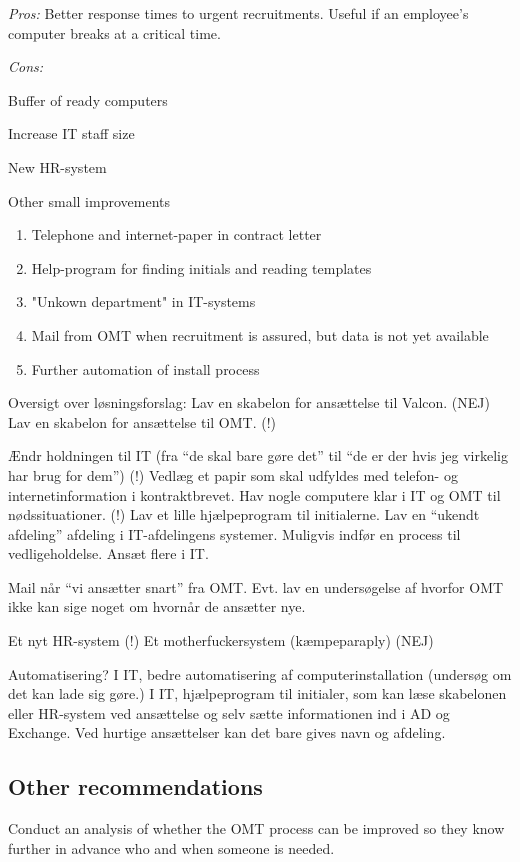 \noindent \emph{Pros:} Better response times to urgent recruitments. Useful if an employee's computer breaks at a critical time.

\noindent \emph{Cons:} 



\item Buffer of ready computers
\item Increase IT staff size
\item New HR-system
\item Other small improvements
\begin{enumerate}
	\item Telephone and internet-paper in contract letter
	\item Help-program for finding initials and reading templates
	\item "Unkown department" in IT-systems
	\item Mail from OMT when recruitment is assured, but data is not yet available
	\item Further automation of install process
\end{enumerate}


Oversigt over løsningsforslag:
Lav en skabelon for ansættelse til Valcon. (NEJ)
Lav en skabelon for ansættelse til OMT. (!)

Ændr holdningen til IT (fra “de skal bare gøre det” til “de er der hvis jeg virkelig har brug for dem”) (!)
Vedlæg et papir som skal udfyldes med telefon- og internetinformation i kontraktbrevet.
Hav nogle computere klar i IT og OMT til nødssituationer. (!)
Lav et lille hjælpeprogram til initialerne. 
Lav en “ukendt afdeling” afdeling i IT-afdelingens systemer. Muligvis indfør en process til vedligeholdelse.
Ansæt flere i IT.

Mail når “vi ansætter snart” fra OMT.
Evt. lav en undersøgelse af hvorfor OMT ikke kan sige noget om hvornår de ansætter nye.

Et nyt HR-system (!)
Et motherfuckersystem (kæmpeparaply) (NEJ)

Automatisering?
I IT, bedre automatisering af computerinstallation (undersøg om det kan lade sig gøre.)
I IT, hjælpeprogram til initialer, som kan læse skabelonen eller HR-system ved ansættelse og selv sætte informationen ind i AD og Exchange. Ved hurtige ansættelser kan det bare gives navn og afdeling.

\subsection{Other recommendations}
Conduct an analysis of whether the OMT process can be improved so they know further in advance who and when someone is needed.